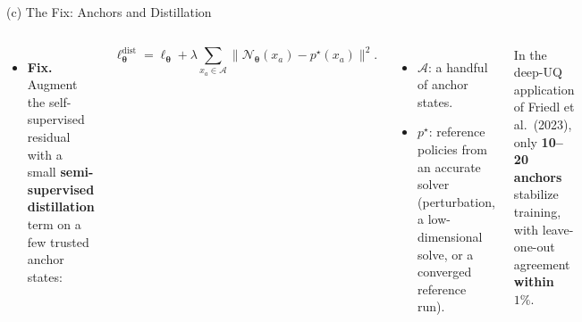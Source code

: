 \documentclass[aspectratio=169,11pt]{beamer}
\newcommand{\lemph}[1]{{\color{uzhblue}\bfseries #1}}
\newcommand{\gemph}[1]{{\color{darkgreen}\bfseries #1}}
\newcommand{\param}{{\bm{\theta}}}
\begin{document}
\begin{frame}{(c) The Fix: Anchors and Distillation}
\vspace*{\fill}
\begin{columns}[T,onlytextwidth]
\begin{itemize}\setlength\itemsep{2pt}
  \item \textbf{\color{uzhblue}Fix.} Augment the self-supervised residual with a
        small \lemph{semi-supervised distillation} term on a few trusted anchor
        states:
\end{itemize}
\[
  \ell^{\mathrm{dist}}_\param=\ell_\param
   +\lambda\!\sum_{x_a\in\mathcal A}\!\bigl\|\mathcal N_\param(x_a)-p^\star(x_a)\bigr\|^2 .
\]
{\footnotesize
\begin{itemize}\setlength\itemsep{2pt}
  \item $\mathcal A$: a handful of anchor states.
  \item $p^\star$: reference policies from an accurate solver (perturbation, a
        low-dimensional solve, or a converged reference run).
\end{itemize}}
\begin{recipe}[Remedy]
\footnotesize In the deep-UQ application of Friedl et al.\ (2023), only
\gemph{10--20 anchors} stabilize training, with leave-one-out agreement
\gemph{within $1\%$}.
\end{recipe}
\end{columns}
\vspace*{\fill}
\end{frame}
\end{document}
